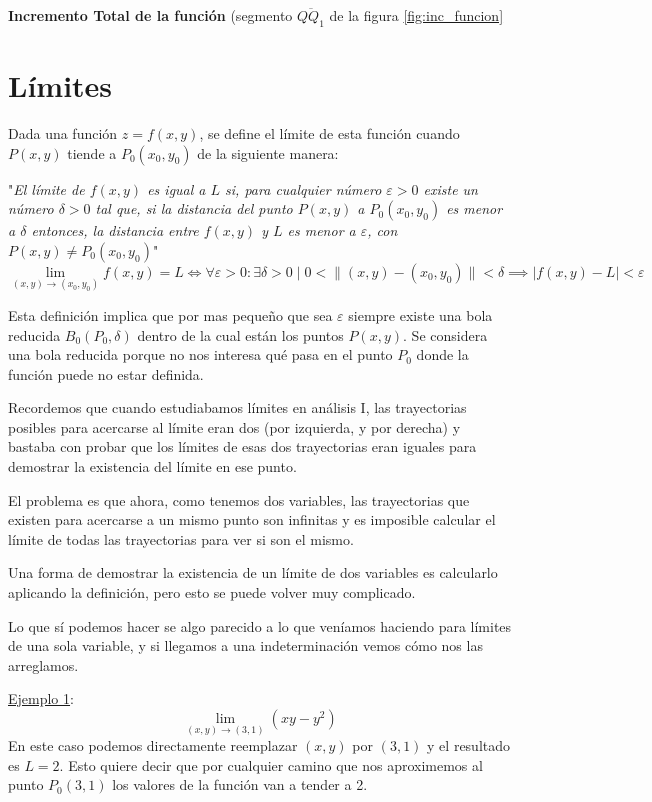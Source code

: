 \documentclass[12pt]{article}
\begin{document}
\textbf{Incremento Total de la función} (segmento $ \overline{QQ_{1}} $ de la figura \ref{fig:inc_funcion}

\section{Límites}
Dada una función $ z = f(x,y) $, se define el límite de esta función cuando $ P(x,y) $ tiende a $ P_{0}(x_{0},y_{0}) $ de la siguiente manera:

"\textit{El límite de $ f(x,y) $ es igual a $ L $ si, para cualquier número $ \varepsilon > 0 $ existe un número $ \delta > 0 $ tal que, si la distancia del punto $ P(x,y) $ a $ P_{0}(x_{0},y_{0}) $ es menor a $ \delta $ entonces, la distancia entre $ f(x,y) $ y $ L $ es menor a $ \varepsilon $, con $ P(x,y) \neq P_{0}(x_{0},y_{0}) $}"
\[
	\lim_{(x,y) \to (x_{0},y_{0})}{f(x,y)} = L \iff \forall \varepsilon > 0 : \exists \delta > 0 \mid 0 < \lVert(x,y) - (x_{0},y_{0})\rVert < \delta \implies \left|f(x,y) - L\right| < \varepsilon
\]

Esta definición implica que por mas pequeño que sea $ \varepsilon{} $ siempre existe una bola reducida $ B_{0}(P_{0},\delta) $ dentro de la cual están los puntos $ P(x,y) $. Se considera una bola reducida porque no nos interesa qué pasa en el punto $ P_{0} $ donde la función puede no estar definida.

Recordemos que cuando estudiabamos límites en análisis I, las trayectorias posibles para acercarse al límite eran dos (por izquierda, y por derecha) y bastaba con probar que los límites de esas dos trayectorias eran iguales para demostrar la existencia del límite en ese punto.

El problema es que ahora, como tenemos dos variables, las trayectorias que existen para acercarse a un mismo punto son infinitas y es imposible calcular el límite de todas las trayectorias para ver si son el mismo.

Una forma de demostrar la existencia de un límite de dos variables es calcularlo aplicando la definición, pero esto se puede volver muy complicado.

Lo que sí podemos hacer se algo parecido a lo que veníamos haciendo para límites de una sola variable, y si llegamos a una indeterminación vemos cómo nos las arreglamos.

\underline{Ejemplo 1}:
\[
	\lim_{(x,y) \to (3,1)}{\left(xy - y^{2}\right)}
\]
En este caso podemos directamente reemplazar $ (x,y) $ por $ (3,1) $ y el resultado es $ L = 2 $. Esto quiere decir que por cualquier camino que nos aproximemos al punto $ P_{0}(3,1) $ los valores de la función van a tender a 2.
\end{document}

